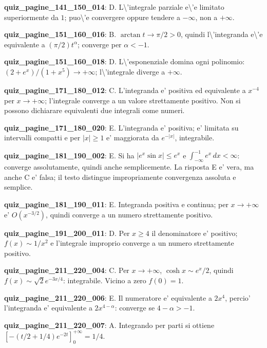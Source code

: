 \documentclass[11pt,a4paper]{article}
\newcounter{quiz}
\begin{document}
\noindent\textbf{quiz\_pagine\_141\_150\_014}: D. L\textbackslash{}'integrale parziale e\textbackslash{}'e limitato superiormente da $1$; puo\textbackslash{}'e convergere oppure tendere a $-\infty$, non a $+\infty$.\par\medskip
\noindent\textbf{quiz\_pagine\_151\_160\_016}: B. $\arctan t\to\pi/2>0$, quindi l\textbackslash{}'integranda e\textbackslash{}'e equivalente a $(\pi/2)t^\alpha$; converge per $\alpha<-1$.\par\medskip
\noindent\textbf{quiz\_pagine\_151\_160\_018}: D. L\textbackslash{}'esponenziale domina ogni polinomio: $(2+e^x)/(1+x^5)\to+\infty$; l\textbackslash{}'integrale diverge a $+\infty$.\par\medskip
\noindent\textbf{quiz\_pagine\_171\_180\_012}: C. L'integranda e' positiva ed equivalente a $x^{-4}$ per $x\to+\infty$; l'integrale converge a un valore strettamente positivo. Non si possono dichiarare equivalenti due integrali come numeri.\par\medskip
\noindent\textbf{quiz\_pagine\_171\_180\_020}: E. L'integranda e' positiva; e' limitata su intervalli compatti e per $|x|\geq1$ e' maggiorata da $e^{-|x|}$, integrabile.\par\medskip
\noindent\textbf{quiz\_pagine\_181\_190\_002}: E. Si ha $|e^x\sin x|\leq e^x$ e $\int_{-\infty}^{-1}e^x\,dx<\infty$: converge assolutamente, quindi anche semplicemente. La risposta E e' vera, ma anche C e' falsa; il testo distingue impropriamente convergenza assoluta e semplice.\par\medskip
\noindent\textbf{quiz\_pagine\_181\_190\_011}: E. Integranda positiva e continua; per $x\to+\infty$ e' $O(x^{-3/2})$, quindi converge a un numero strettamente positivo.\par\medskip
\noindent\textbf{quiz\_pagine\_191\_200\_011}: D. Per $x\ge4$ il denominatore e' positivo; $f(x)\sim1/x^2$ e l'integrale improprio converge a un numero strettamente positivo.\par\medskip
\noindent\textbf{quiz\_pagine\_211\_220\_004}: C. Per $x\to+\infty$, $\cosh x\sim e^x/2$, quindi $f(x)\sim\sqrt2 e^{-3x/4}$: integrabile. Vicino a zero $f(0)=1$.\par\medskip
\noindent\textbf{quiz\_pagine\_211\_220\_006}: E. Il numeratore e' equivalente a $2x^4$, percio' l'integranda e' equivalente a $2x^{4-\alpha}$: converge se $4-\alpha>-1$.\par\medskip
\noindent\textbf{quiz\_pagine\_211\_220\_007}: A. Integrando per parti si ottiene $[-(t/2+1/4)e^{-2t}]_0^{+\infty}=1/4$.\par\medskip
\end{document}
